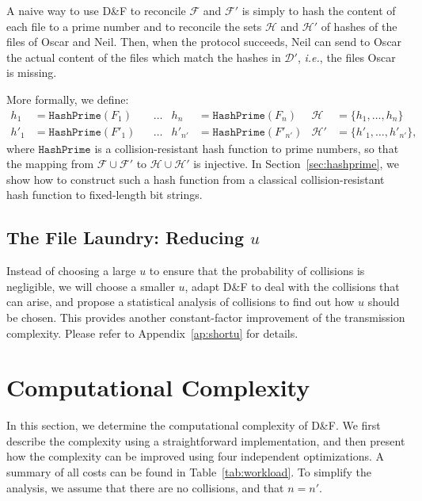 \documentclass[twoside,envcountsame,runningheads]{llncs}
\newcommand{\Set}{\mathcal{H}}
\newcommand{\SetD}{\mathcal{D}}
\newcommand{\Files}{\mathcal{F}}
\newcommand{\df}{D\&F\xspace}
\newcommand{\ie}{\textit{i.e.}\xspace}
\newcommand{\HashPrime}{\ensuremath{\mathtt{HashPrime}}}
\newcommand{\apref}[1]{Appendix~\ref{#1}}
\newcommand{\apref}[1]{the full version~TODO}
\begin{document}
A naive way to use \df to reconcile $\Files$ and $\Files'$ is simply to hash the content of each file to a prime number and to reconcile the sets $\Set$ and $\Set'$ of hashes of the files of Oscar and Neil.
Then, when the protocol succeeds, Neil can send to Oscar the actual content of the files which match the hashes in $\SetD'$, \ie, the files Oscar is missing.

More formally, we define:
\begin{align*}
h_1 &= \HashPrime(F_1) & &\dots & h_n &= \HashPrime(F_n) & \Set &= \{h_1,\dots,h_n\} \\
h'_1 &= \HashPrime(F'_1) & &\dots & h'_{n'} &= \HashPrime(F'_{n'}) & \Set' &= \{h'_1,\dots,h'_{n'}\},
\end{align*}
where $\HashPrime$ is a collision-resistant hash function to prime numbers, so that the mapping from $\Files \cup \Files'$ to $\Set \cup \Set'$ is injective.
In Section~\ref{sec:hashprime}, we show how to construct such a hash function from a classical collision-resistant hash function to fixed-length bit strings.

\subsection{The File Laundry: Reducing $u$}
\label{sec:shortu}

Instead of choosing a large $u$ to ensure that the probability of collisions is negligible, we will choose a smaller $u$, adapt \df to deal with the collisions that can arise, and propose a statistical analysis of collisions to find out how $u$ should be chosen.
This provides another constant-factor improvement of the transmission complexity. Please refer to \apref{ap:shortu} for details.

\section{Computational Complexity}
\label{sec:comp}
In this section, we determine the computational complexity of \df. We first describe the complexity using a straightforward implementation, and then present how the complexity can be improved using four independent optimizations. A summary of all costs can be found in Table~\ref{tab:workload}.
To simplify the analysis, we assume that there are no collisions, and that $n=n'$.

\end{document}
